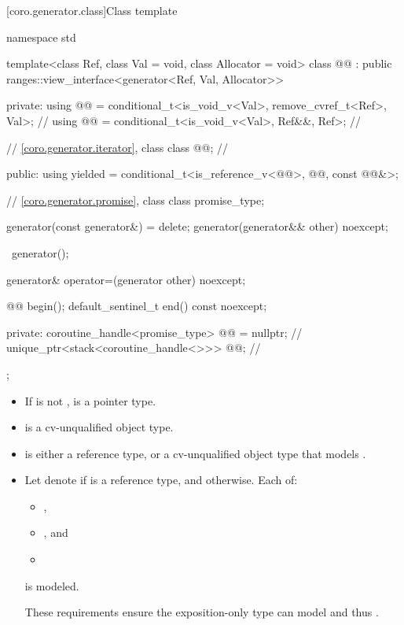 [coro.generator.class]{Class template }

\begin{codeblock}
namespace std {
  template<class Ref, class Val = void, class Allocator = void>
  class @@ : public ranges::view_interface<generator<Ref, Val, Allocator>> {
  private:
    using @@ = conditional_t<is_void_v<Val>, remove_cvref_t<Ref>, Val>;  // \expos
    using @@ = conditional_t<is_void_v<Val>, Ref&&, Ref>;          // \expos

    // \ref{coro.generator.iterator}, class 
    class @@;                                                     // \expos

  public:
    using yielded =
      conditional_t<is_reference_v<@@>, @@, const @@&>;

    // \ref{coro.generator.promise}, class 
    class promise_type;

    generator(const generator&) = delete;
    generator(generator&& other) noexcept;

    ~generator();

    generator& operator=(generator other) noexcept;

    @@ begin();
    default_sentinel_t end() const noexcept;

  private:
    coroutine_handle<promise_type> @@ = nullptr;  // \expos
    unique_ptr<stack<coroutine_handle<>>> @@;        // \expos
  };
}
\end{codeblock}

\pnum
\mandates
\begin{itemize}
\item
If  is not ,
 is a pointer type.
\item
{} is a cv-unqualified object type.
\item
{} is either a reference type, or
a cv-unqualified object type that models .
\item
Let  denote 
if  is a reference type,
and  otherwise.
Each of:
\begin{itemize}
\item {},
\item {}, and
\item {}
\end{itemize}
is modeled.
\begin{note}
These requirements ensure the exposition-only  type
can model  and thus .
\end{note}
\end{itemize}

